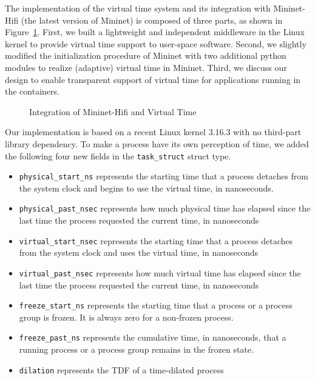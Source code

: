\label{VT:Sec:Implementation}

The implementation of the virtual time system and its integration with Mininet-Hifi (the latest version of Mininet) is composed of three parts,
as shown in Figure~\ref{VT:Fig:VTMininetHifi}.
First, we built a lightweight and independent middleware in the Linux kernel to provide virtual time support to user-space software.
Second, we slightly modified the initialization procedure of Mininet with two additional python modules to realize (adaptive) virtual time in Mininet.
Third, we discuss our design to enable transparent support of virtual time for applications running in the containers.

\begin{figure}
    \centering
    \caption{Integration of Mininet-Hifi and Virtual Time}
    \label{VT:Fig:VTMininetHifi}
\end{figure}

\label{VT:SubSec:ExtendLinuxKernel}
Our implementation is based on a recent Linux kernel 3.16.3 with no third-part library dependency.
To make a process have its own perception of time, we added the following four new fields in the \texttt{task\_struct} struct type.
\begin{itemize}
    \item \texttt{physical\_start\_ns} represents the starting time that a process detaches from the system clock and begins to use the virtual time, in nanoseconds.
    \item \texttt{physical\_past\_nsec} represents how much physical time has elapsed since the last time the process requested the current time, in nanoseconds
    \item \texttt{virtual\_start\_nsec} represents the starting time that a process detaches from the system clock and uses the virtual time, in nanoseconds 
    \item \texttt{virtual\_past\_nsec} represents how much virtual time has elapsed since the last time the process requested the current time, in nanoseconds
    \item \texttt{freeze\_start\_ns} represents the starting time that a process or a process group is frozen. It is always zero for a non-frozen process.
    \item \texttt{freeze\_past\_ns} represents the cumulative time, in nanoseconds, that a running process or a process group remains in the frozen state.
    \item \texttt{dilation} represents the TDF of a time-dilated process
\end{itemize}

